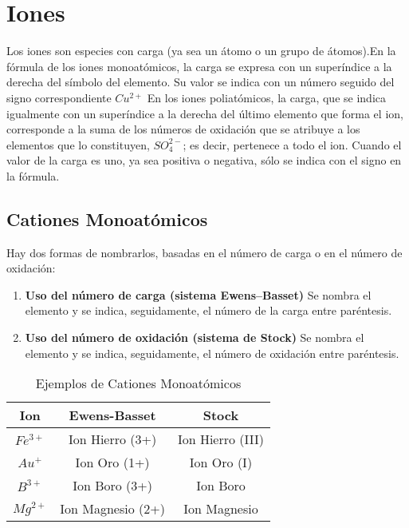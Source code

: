 \section{Iones}
Los iones son especies con carga (ya sea un átomo o un grupo de átomos).En la fórmula de los iones monoatómicos, la carga se expresa con un superíndice a la derecha del símbolo del elemento. Su valor se indica con un número seguido del signo correspondiente $Cu^{2+}$ En los iones poliatómicos, la carga, que se indica igualmente con un superíndice a la derecha del último elemento que forma el ion, corresponde a la suma de los números de oxidación que se atribuye a los elementos que lo constituyen, $SO_{4}^{2-}$; es decir, pertenece a todo el ion. Cuando el valor de la carga es uno, ya sea positiva o negativa, sólo se indica con el signo en la fórmula.

\subsection{Cationes Monoatómicos}
Hay dos formas de nombrarlos, basadas en el número de carga o en el número de oxidación:\\
\begin{enumerate}
	
	\item \textbf{Uso del número de carga (sistema Ewens–Basset)} Se nombra el elemento y se indica, seguidamente, el número de la carga entre paréntesis.
	
	\item \textbf{Uso del número de oxidación (sistema de Stock)} Se nombra el elemento y se indica, seguidamente, el número de oxidación entre paréntesis.

\end{enumerate}

\begin{table}[h!]
	\centering\begin{tabular}{c|cc}
		Ion&Ewens-Basset&Stock \\ \hline
		$Fe^{3+}$&Ion Hierro (3+)&Ion Hierro (III)\\
		$Au^{+}$&Ion Oro (1+)&Ion Oro (I)\\
		$B^{3+}$&Ion Boro (3+)&Ion Boro\\
		$Mg^{2+}$&Ion Magnesio (2+)&Ion Magnesio \\ \hline
	\end{tabular}
	\caption{Ejemplos de Cationes Monoatómicos}
\end{table}

